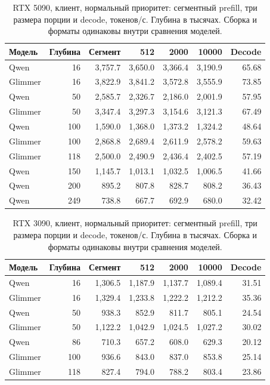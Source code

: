\begin{table}[t]
\centering
\caption{RTX 5090, клиент, нормальный приоритет: сегментный prefill, три размера порции и decode,
токенов/с. Глубина в тысячах. Сборка и форматы одинаковы внутри сравнения моделей.}
\label{tab:client-5090}
\footnotesize
\begin{tabular}{lrrrrrr}
\toprule
Модель & Глубина & Сегмент & 512 & 2000 & 10000 & Decode \\
\midrule
Qwen & 16 & 3,757.7 & 3,650.0 & 3,366.4 & 3,190.9 & 65.68 \\
Glimmer & 16 & 3,822.9 & 3,841.2 & 3,572.8 & 3,555.9 & 73.85 \\
Qwen & 50 & 2,585.7 & 2,326.7 & 2,186.0 & 2,001.9 & 57.95 \\
Glimmer & 50 & 3,347.4 & 3,297.3 & 3,154.6 & 3,121.3 & 67.49 \\
Qwen & 100 & 1,590.0 & 1,368.0 & 1,373.2 & 1,324.2 & 48.64 \\
Glimmer & 100 & 2,868.8 & 2,689.4 & 2,611.9 & 2,578.2 & 59.63 \\
Glimmer & 118 & 2,500.0 & 2,490.9 & 2,436.4 & 2,402.5 & 57.19 \\
Qwen & 150 & 1,145.7 & 1,013.1 & 1,032.5 & 1,006.5 & 41.66 \\
Qwen & 200 & 895.2 & 807.8 & 828.7 & 808.2 & 36.43 \\
Qwen & 249 & 738.8 & 667.7 & 692.9 & 680.0 & 32.42 \\
\bottomrule
\end{tabular}
\end{table}

\begin{table}[t]
\centering
\caption{RTX 3090, клиент, нормальный приоритет: сегментный prefill, три размера порции и decode,
токенов/с. Глубина в тысячах. Сборка и форматы одинаковы внутри сравнения моделей.}
\label{tab:client-3090}
\footnotesize
\begin{tabular}{lrrrrrr}
\toprule
Модель & Глубина & Сегмент & 512 & 2000 & 10000 & Decode \\
\midrule
Qwen & 16 & 1,306.5 & 1,187.9 & 1,137.7 & 1,089.4 & 31.51 \\
Glimmer & 16 & 1,329.4 & 1,233.8 & 1,222.2 & 1,212.2 & 35.36 \\
Qwen & 50 & 938.3 & 852.9 & 811.7 & 805.1 & 24.54 \\
Glimmer & 50 & 1,122.2 & 1,042.9 & 1,024.5 & 1,027.2 & 30.02 \\
Qwen & 86 & 710.3 & 657.2 & 608.0 & 629.3 & 20.12 \\
Glimmer & 100 & 936.6 & 843.0 & 837.0 & 853.8 & 25.14 \\
Glimmer & 118 & 827.4 & 794.0 & 788.2 & 803.4 & 23.86 \\
\bottomrule
\end{tabular}
\end{table}


